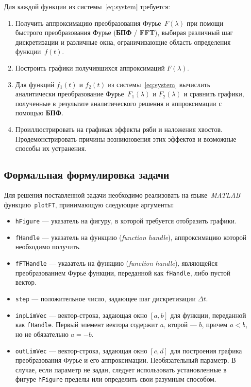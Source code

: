 \documentclass[a4paper, 11pt]{article}
\begin{document}
        Для каждой функции из системы~\eqref{eq:system} требуется:
        \begin{enumerate}
            \item Получить аппроксимацию преобразования Фурье~$F(\lambda)$ при помощи быстрого преобразования Фурье (\textbf{БПФ} / \textbf{FFT}), выбирая различный шаг дискретизации и различные окна, ограничивающие область определения функции~$f(t)$.
            \item Построить графики получившихся аппроксимаций $F(\lambda)$.
            \item Для функций $f_1(t)$ и $f_2(t)$ из системы~\eqref{eq:system} вычислить аналитически преобразование Фурье~$F_1(\lambda)$ и $F_2(\lambda)$ и сравнить графики, полученные в результате аналитического решения и аппроксимации с помощью \textbf{БПФ}.
            \item Проиллюстрировать на графиках эффекты ряби и наложения хвостов. Продемонстрировать причины возникновения этих эффектов и возможные способы их устранения.
        \end{enumerate}
        
    \subsection{Формальная формулировка задачи}
        Для решения поставленной задачи необходимо реализовать на языке~\textit{MATLAB} функцию~\texttt{plotFT}, принимающую следующие аргументы:
        \begin{itemize}
            \item \texttt{hFigure} --- указатель на фигуру, в которой требуется отобразить графики.
            \item \texttt{fHandle} --- указатель на функцию (\textit{function handle}), аппроксимацию которой необходимо получить.
            \item \texttt{fFTHandle} --- указатель на функцию (\textit{function handle}), являющейся преобразованием Фурье функции, переданной как \texttt{fHandle}, либо пустой вектор.
            \item \texttt{step} --- положительное число, задающее шаг дискретизации $\Delta t$.
            \item \texttt{inpLimVec} --- вектор-строка, задающая окно $[a, b]$ для функции, переданной как \texttt{fHandle}. Первый элемент вектора содержит $a$, второй --- $b$, причем $a < b$, но не обязательно $ a = -b$.
            \item \texttt{outLimVec} --- вектор-строка, задающая окно $[c, d]$ для построения графика преобразования Фурье и его аппроксимации. Необязательный параметр. В случае, если параметр не задан, следует использовать установленные в фигуре \texttt{hFigure} пределы или определить свои разумным способом.
        \end{itemize}
        
\end{document}
